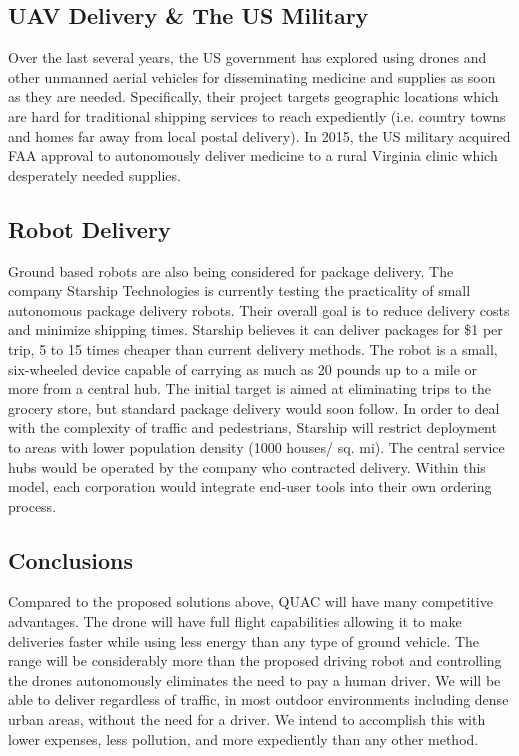 \documentclass[12pt]{extarticle}
\begin{document}
\subsection{UAV Delivery \& The US Military}

Over the last several years, the US government has explored using drones and other unmanned aerial vehicles for disseminating medicine and supplies as soon as they are needed.  Specifically, their project targets geographic locations which are hard for traditional shipping services to reach expediently (i.e. country towns and homes far away from local postal delivery).  In 2015, the US military acquired FAA approval to autonomously deliver medicine to a rural Virginia clinic which desperately needed supplies.  

\subsection{Robot Delivery}

Ground based robots are also being considered for package delivery. The company Starship Technologies is currently testing the practicality of small autonomous package delivery robots. Their overall goal is to reduce delivery costs and minimize shipping times.  Starship believes it can deliver packages for \$1 per trip, 5 to 15 times cheaper than current delivery methods. The robot is a small, six-wheeled device capable of carrying as much as 20 pounds up to a mile or more from a central hub. The initial target is aimed at eliminating trips to the grocery store, but standard package delivery would soon follow. In order to deal with the complexity of traffic and pedestrians, Starship will restrict deployment to areas with lower population density (1000 houses/ sq. mi). The central service hubs would be operated by the company who contracted delivery.  Within this model, each corporation would integrate end-user tools into their own ordering process.

\subsection{Conclusions}

Compared to the proposed solutions above, QUAC will have many competitive advantages. The drone will have full flight capabilities allowing it to make deliveries faster while using less energy than any type of ground vehicle. The range will be considerably more than the proposed driving robot and controlling the drones autonomously eliminates the need to pay a human driver. We will be able to deliver regardless of traffic, in most outdoor environments including dense urban areas, without the need for a driver.  We intend to accomplish this with lower expenses, less pollution, and more expediently than any other method.
\end{document}
